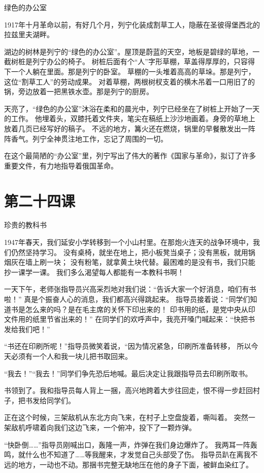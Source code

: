 \documentclass[12pt,UTF8]{ctexbook}
\begin{document}
绿色的办公室

1917年十月革命以前，有好几个月，列宁化装成割草工人，隐蔽在圣彼得堡西北的拉兹里夫湖畔。

湖边的树林是列宁的“绿色的办公室”。屋顶是蔚蓝的天空，地板是碧绿的草地，一截树桩是列宁办公的椅子。
树桩后面有个“人”字形草棚，草盖得厚厚的，只容得下一个人躺在里面。那是列宁的卧室。
草棚的一头堆着高高的草垛。那是列宁，这位“割草工人”的劳动成果。
对着草棚，两根树杈支着的横木吊着一口用旧了的锅，旁边放着一把黑铁水壶。那是列宁的厨房。

天亮了，“绿色的办公室”沐浴在柔和的晨光中，列宁已经坐在了树桩上开始了一天的工作。
他埋着头，双膝托着文件夹，笔尖在稿纸上沙沙地画着。身旁的草地上放着几页已经写好的稿子。
不远的地方，篝火还在燃烧，锅里的早餐散发出一阵阵香气。列宁全神贯注地工作，忘记了周围的一切。

在这个最简陋的“办公室”里，列宁写出了伟大的著作《国家与革命》，拟订了许多重要文件，有力地指导着俄国革命。

\section{第二十四课}

珍贵的教科书

1947年春天，我们延安小学转移到一个小山村里。在那炮火连天的战争环境中，我们仍然坚持学习。
没有桌椅，就坐在地上，把小板凳当桌子；没有黑板，就用锅烟灰在墙上刷一块；
没有粉笔，就拿黄土块代替。最困难的是没有书，我们只能抄一课学一课。
我们多么渴望每人都能有一本教科书啊！

一天下午，老师张指导员兴高采烈地对我们说：“告诉大家一个好消息，咱们有书啦！”
真是个振奋人心的消息，我们都高兴得跳起来。
指导员接着说：“同学们知道书是怎么来的吗？是在毛主席的关怀下印出来的！
印书用的纸，是党中央从印文件用的纸里节省出来的！”
在同学们的欢呼声中，我亮开嗓门喊起来：“快把书发给我们吧！”

“书还在印刷所呢！”指导员微笑着说，“因为情况紧急，印刷所准备转移，
所以今天必须有一个人和我一块儿把书取回来。

“我去！”“我去！”同学们争先恐后地喊。最后决定让我跟指导员去印刷所取书。

书领到了。我和指导员每人背上一捆，高兴地跨着大步往回走，恨不得一步赶回村子，把书发给同学们。

正在这个时候，三架敌机从东北方向飞来，在村子上空盘旋着，嘶叫着。
突然一架敌机呼啸着向我们这边飞来，一个俯冲，投下了一颗炸弹。

“快卧倒……”指导员刚喊出口，轰隆一声，炸弹在我们身边爆炸了。
我两耳一阵轰鸣，就什么也不知道了……等我醒来，才发觉自己头部受了伤。
指导员趴在离我不远的地方，一动也不动。那捆书完整无缺地压在他的身子下面，被鲜血染红了。
\end{document}
